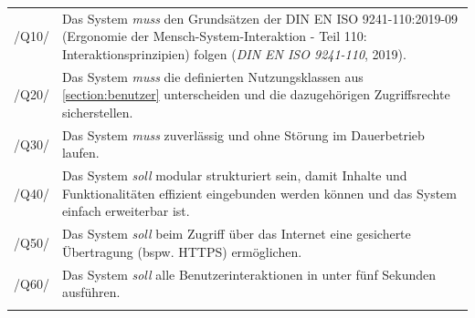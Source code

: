 \begin{center}
        \renewcommand{\arraystretch}{1.5}
        \begin{longtable}{lp{}}
                \arrayrulecolor{maincolor}\hline
                 \sffamily\color{maincolor}/Q10/ & Das System \textit{muss} den Grundsätzen der DIN EN ISO
                9241-110:2019-09 (Ergonomie der Mensch-System-Interaktion - Teil 110:
                Interaktionsprinzipien) folgen (\textit{DIN EN ISO 9241-110}, 2019). \\
                 \sffamily\color{maincolor}/Q20/ & Das System \textit{muss} die definierten Nutzungsklassen aus
                \ref{section:benutzer} unterscheiden und die dazugehörigen Zugriffsrechte
                sicherstellen. \\
                \sffamily\color{maincolor}/Q30/ & Das System \textit{muss} zuverlässig und ohne Störung im Dauerbetrieb laufen.\\
                 \sffamily\color{maincolor}/Q40/ & Das System \textit{soll} modular strukturiert sein, damit Inhalte
                und Funktionalitäten effizient eingebunden werden können und das System einfach
                erweiterbar ist. \\
                 \sffamily\color{maincolor}/Q50/ & Das System \textit{soll} beim Zugriff über das Internet eine
                gesicherte Übertragung (bspw. \ac{HTTPS}) ermöglichen. \\
                 \sffamily\color{maincolor}/Q60/ & Das System \textit{soll} alle Benutzerinteraktionen in unter fünf
                Sekunden ausführen. \\
                \arrayrulecolor{maincolor}\hline
        \end{longtable}
\end{center}
